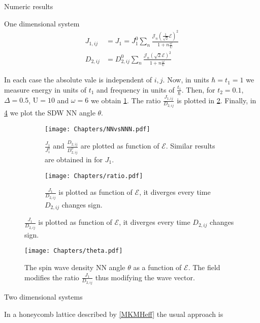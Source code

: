 \begin{section}{Numeric results}
\begin{subsection}{One dimensional system}
\begin{align}
J_{1,ij} &= J_{1} = J_{1}^0  \sum_{n} \frac{\mathcal{J}_n(\frac{1}{\sqrt{2}}\mathcal{E})^2}{1+n\frac{\omega}{\text{U}}} \\
D_{2,ij} &= D_{2,ij}^0  \sum_{n} \frac{\mathcal{J}_n(\sqrt{2}\mathcal{E})^2}{1+n\frac{\omega}{\text{U}}}
\end{align}

In each case the absolute vale is independent of $i,j$.  Now, in units $\hbar=t_1=1$ we measure energy in units of $t_1$ and frequency in units of $\frac{t_1}{\hbar}$. Then, for $t_2 = 0.1$, $\Delta = 0.5$, $\text{U} = 10$ and $\omega = 6$ we obtain \ref{Fig1:NNvsNNN}. The ratio $\frac{J_{1,ij}}{D_{2,ij}}$ is plotted in \ref{Fig1:ratio}. Finally, in \ref{Fig2} we plot the SDW NN angle $\theta$.

\begin{figure}
\centering
\begin{subfigure}{.5\textwidth}
  \centering
  \texttt{[image: Chapters/NNvsNNN.pdf]}
  \caption{$\frac{J_{1}}{J_{1}^0}$ and $\frac{D_{2,ij}}{D_{2,ij}^0}$ are plotted as function of $\mathcal{E}$. Similar results are obtained in \cite{Mentink2015} for $J_{1}$.}
  \label{Fig1:NNvsNNN}
\end{subfigure}%
\begin{subfigure}{.5\textwidth}
  \centering
  \texttt{[image: Chapters/ratio.pdf]}
  \caption{$\frac{J_{1}}{D_{2,ij}}$ is plotted as function of $\mathcal{E}$, it diverges every time $D_{2,ij}$ changes sign.}
  \label{Fig1:ratio}
\end{subfigure}
\label{Fig1}
\end{figure}

\begin{figure}
\centering
  \texttt{[image: Chapters/theta.pdf]}
  \caption{The spin wave density NN angle $\theta$ as a function of $\mathcal{E}$. The field modifies the ratio $\frac{J_{1}}{D_{2,ij}}$ thus modifying the wave vector.}
\label{Fig2}
\end{figure}

\end{subsection}

\begin{subsection}{Two dimensional systems}
 
In a honeycomb lattice described by \ref{MKMHeff} the usual approach is 

\end{subsection}

\end{section}
